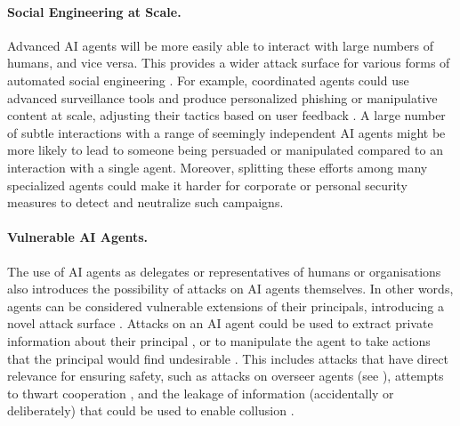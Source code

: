 \paragraph{Social Engineering at Scale.}
Advanced AI agents will be more easily able to interact with large numbers of humans, and vice versa.
This provides a wider attack surface for various forms of {automated social engineering} \citep{ai_defending_2024}.
For example, coordinated agents could use advanced surveillance tools and produce personalized phishing or manipulative content at scale, adjusting their tactics based on user feedback \citep{hazell_large_2023,figueiredo2024feasibilityfullyaiautomatedvishing}. 
A large number of subtle interactions with a range of seemingly independent AI agents might be more likely to lead to someone being persuaded or manipulated compared to an interaction with a single agent.
Moreover, splitting these efforts among many specialized agents could make it harder for corporate or personal security measures to detect and neutralize such campaigns.

\paragraph{Vulnerable AI Agents.}
The use of AI agents as delegates or representatives of humans or organisations also introduces the possibility of {attacks on AI agents} themselves.
In other words, agents can be considered vulnerable extensions of their principals, introducing a novel attack surface \citep{secureworks_unravelling_2023}.
Attacks on an AI agent could be used to extract private information about their principal \citep{wu_inference_2024,wei_trustworthy_2024}, or to manipulate the agent to take actions that the principal would find undesirable \citep{zhang2024breakingagentscompromisingautonomous}.
This includes attacks that have direct relevance for ensuring safety, such as attacks on overseer agents (see ), attempts to thwart cooperation \citep{Lamport1982,Huang2024}, and the leakage of information (accidentally or deliberately) that could be used to enable collusion \citep{motwani2024secret}.


